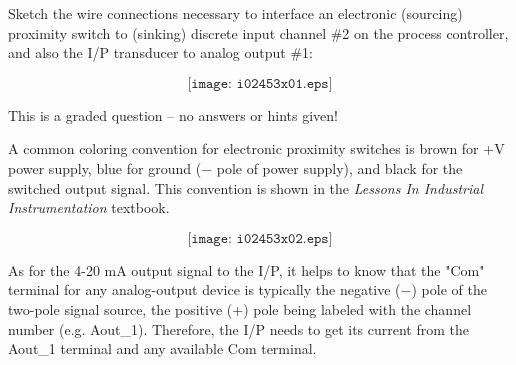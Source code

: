 

Sketch the wire connections necessary to interface an electronic (sourcing) proximity switch to (sinking) discrete input channel \#2 on the process controller, and also the I/P transducer to analog output \#1:

$$\texttt{[image: i02453x01.eps]}$$

\vfil

\eject






This is a graded question -- no answers or hints given!







A common coloring convention for electronic proximity switches is brown for +V power supply, blue for ground ($-$ pole of power supply), and black for the switched output signal.  This convention is shown in the {\it Lessons In Industrial Instrumentation} textbook.

$$\texttt{[image: i02453x02.eps]}$$

As for the 4-20 mA output signal to the I/P, it helps to know that the "Com" terminal for any analog-output device is typically the negative ($-$) pole of the two-pole signal source, the positive (+) pole being labeled with the channel number (e.g. Aout\_1).  Therefore, the I/P needs to get its current from the Aout\_1 terminal and any available Com terminal.




